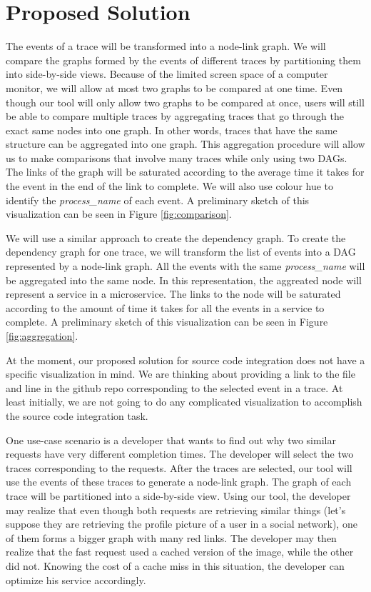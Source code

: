 \section{Proposed Solution}

The events of a trace will be transformed into a node-link graph. We will compare the graphs formed by the events of different traces
by partitioning them into side-by-side views. Because of the limited screen space of a computer monitor, we will allow at most two
graphs to be compared at one time. Even though our tool will only allow two graphs to be compared at once, users will still be able
to compare multiple traces by aggregating traces that go through the exact same nodes into one graph. In other words, traces that have
the same structure can be aggregated into one graph. This aggregation procedure will allow us to make comparisons that involve many
traces while only using two DAGs. The links of the graph will be saturated according to the average time it takes for the event in
the end of the link to complete. We will also use colour hue to identify the \textit{process\_name} of each event. A preliminary sketch of
this visualization can be seen in Figure \ref{fig:comparison}.

We will use a similar approach to create the dependency graph. To create the dependency graph for one trace, we will transform the list
of events into a DAG represented by a node-link graph. All the events with the same \textit{process\_name} will be aggregated into the same
node. In this representation, the aggreated node will represent a service in a microservice. The links to the node will be saturated according
to the amount of time it takes for all the events in a service to complete. A preliminary sketch of this visualization can be seen in Figure \ref{fig:aggregation}.

At the moment, our proposed solution for source code integration does not have a specific visualization in mind. We are thinking about
providing a link to the file and line in the github repo corresponding to the selected event in a trace. At least initially, we are not
going to do any complicated visualization to accomplish the source code integration task.

One use-case scenario is a developer that wants to find out why two similar requests have very different completion times. The developer
will select the two traces corresponding to the requests. After the traces are selected, our tool will use the events of these traces
to generate a node-link graph. The graph of each trace will be partitioned into a side-by-side view. Using our tool, the developer may
realize that even though both requests are retrieving similar things (let's suppose they are retrieving the profile picture of a user in 
a social network), one of them forms a bigger graph with many red links. The developer may then realize that the fast request used a cached
version of the image, while the other did not. Knowing the cost of a cache miss in this situation, the developer can optimize his service
accordingly. 

